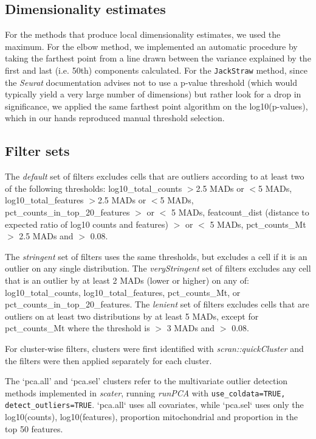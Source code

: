 \documentclass[11pt]{article}
\begin{document}
\subsection*{Dimensionality estimates}

For the methods that produce local dimensionality estimates, we used the maximum. For the elbow method, we implemented an automatic procedure by taking the farthest point from a line drawn between the variance explained by the first and last (i.e. 50th) components calculated. For the \texttt{JackStraw} method, since the \textit{Seurat} documentation advises not to use a p-value threshold (which would typically yield a very large number of dimensions) but rather look for a drop in significance, we applied the same farthest point algorithm on the log10(p-values), which in our hands reproduced manual threshold selection.

\subsection*{Filter sets}
The \textit{default} set of filters excludes cells that are outliers according to at least two of the following thresholds: log10\_total\_counts $>$2.5 MADs or $<$5 MADs, log10\_total\_features $>$2.5 MADs or $<$5 MADs, pct\_counts\_in\_top\_20\_features $>$ or $<$ 5 MADs, featcount\_dist (distance to expected ratio of log10 counts and features) $>$ or $<$ 5 MADs, pct\_counts\_Mt $>$ 2.5 MADs and $>$ 0.08.

The \textit{stringent} set of filters uses the same thresholds, but excludes a cell if it is an outlier on any single distribution. 
{\color{red}The \textit{veryStringent} set of filters excludes any cell that is an outlier by at least 2 MADs (lower or higher) on any of: log10\_total\_counts, log10\_total\_features, pct\_counts\_Mt, or pct\_counts\_in\_top\_20\_features.}
The \textit{lenient} set of filters excludes cells that are outliers on at least two distributions by at least 5 MADs, except for pct\_counts\_Mt where the threshold is $>$ 3 MADs and $>$ 0.08.

For cluster-wise filters, clusters were first identified with \textit{scran::quickCluster} and the filters were then applied separately for each cluster. 

The `pca.all' and `pca.sel' clusters refer to the multivariate outlier detection methods implemented in \textit{scater}, running \textit{runPCA} with \texttt{use\_coldata=TRUE, detect\_outliers=TRUE}. `pca.all` uses all covariates, while `pca.sel` uses only the log10(counts), log10(features), proportion mitochondrial and proportion in the top 50 features.
\end{document}
